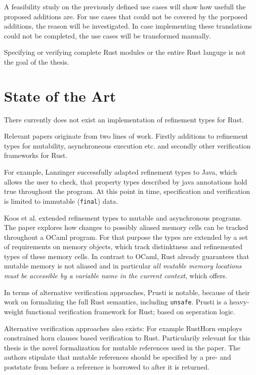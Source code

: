 \documentclass[11pt]{article}
\begin{document}
A feasibility study on the previously defined use cases will show how usefull the proposed additions are. For use cases that could not be covered by the porposed additions, the reason will be investigated.
In case implementing these translations could not be completed, the use cases will be transformed manually.

Specifying or verifying complete Rust modules or the entire Rust languge is not the goal of the thesis.

\section{State of the Art}

There currently does not exist an implementation of refinement types for Rust.

Relevant papers originate from two lines of work. Firstly additions to refinement types for mutability, asynchroneous execution etc. and secondly other verification frameworks for Rust.

For example, Lanzinger \cite{lanzinger_property_2021} successfully adapted refinement types to Java, which allows the user to check, that property types described by java annotations hold true throughout the program. At this point in time, specification and verification is limited to immutable (\texttt{final}) data.

Koos et al. \cite{kloos_asynchronous_2015} extended refinement types to mutable and asynchronous programs. The paper explores how changes to possibly aliased memory cells can be tracked throughout a OCaml program. For that purpose the types are extended by a set of requirements on memory objects, which track distinktness and refinemented types of these memory cells. In contrast to OCaml, Rust already guarantees that mutable memory is not aliased and in particular \textit{all mutable memory locations must be accessible by a variable name in the current context}, which offers.

In terms of alternative verification approaches, Prusti\cite{astrauskas_leveraging_2019} is notable, because of their work on formalizing the full Rust semantics, including \texttt{unsafe}. Prusti is a heavy-weight functional verification framework for Rust; based on seperation logic.

Alternative verification approaches also exists: For example RustHorn\cite{matsushita_rusthorn_2020} employs constrained horn clauses based verification to Rust. Particularily relevant for this thesis is the novel formalization for mutable references used in the paper. The authors stipulate that mutable references should be specified by a pre- and poststate from before a reference is borrowed to after it is returned.
\end{document}
